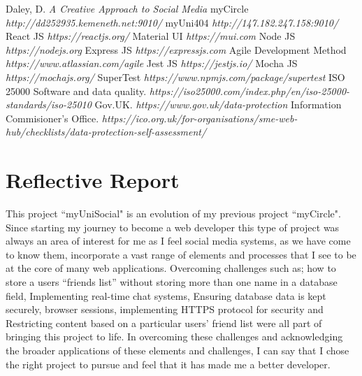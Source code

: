 \documentclass[lettersize,journal]{IEEEtran}
\begin{document}
\begin{thebibliography}{}
        Daley, D. {\it{A Creative Approach to Social Media}}
        myCircle
        {\it{http://dd252935.kemeneth.net:9010/}}
    myUni404
    {\it{http://147.182.247.158:9010/}}
        React JS
        {\it{https://reactjs.org/}}
        Material UI
        {\it{https://mui.com}}
        Node JS
        {\it{https://nodejs.org}}
        Express JS
        {\it{https://expressjs.com}}
        Agile Development Method
        {\it{https://www.atlassian.com/agile}}
        Jest JS
        {\it{https://jestjs.io/}}
        Mocha JS
        {\it{https://mochajs.org/}}
        SuperTest
        {\it{https://www.npmjs.com/package/supertest}}
        ISO 25000 Software and data quality.
        {\it{https://iso25000.com/index.php/en/iso-25000-standards/iso-25010}}
        Gov.UK. {\it{https://www.gov.uk/data-protection}}
        Information Commisioner's Office. {\it{https://ico.org.uk/for-organisations/sme-web-hub/checklists/data-protection-self-assessment/}}
\end{thebibliography}
\appendices
\newpage
\clearpage
\newpage

\section{Reflective Report}
 
This project ``myUniSocial" is an evolution of my previous project ``myCircle". Since starting my journey to become a web developer this type of project was always an
area of interest for me as I feel social media systems, as we have come to know them, incorporate a vast range of elements and processes that I see to be at the core of many
web applications.
Overcoming challenges such as; how to store a users “friends list” without storing more than one name in a database field, 
Implementing real-time chat systems, 
Ensuring database data is kept securely, browser sessions, implementing HTTPS protocol for security and 
Restricting content based on a particular users' friend list were all part of bringing this project to life. 
In overcoming these challenges and acknowledging the broader applications of these elements and challenges, I can say that I chose the right project to pursue and feel that it has made me a better developer.
\end{document}
